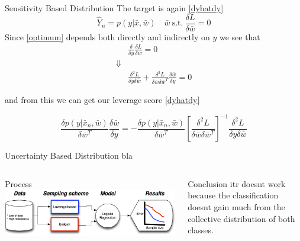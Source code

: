 \documentclass{beamer}
\newenvironment{pblock}{\begin{minipage}[b]{\linewidth}
	\begin{block}}{\end{block} 	\end{minipage}\vspace*{15pt}}
\begin{document}
{\begin{columns}[t]
\begin{column}{.3\linewidth}
    
    	\begin{pblock}{Sensitivity Based Distribution}
    	The target is again \eqref{dyhatdy} 
    	\begin{equation*}
    	\label{optimum}
    	 \hat{Y}_n = p(y|\bar{x},\bar{w}) \quad \bar{w} \  \text{s.t.} \ \frac{\delta L}{\delta\bar{w}}=0
    	\end{equation*}
    	Since \ref{optimum} depends both directly and indirectly on $y$ we see that
    	\begin{eqnarray*}
    	&\frac{\delta}{\delta y} \frac{\delta L}{\delta w} = 0\\
    	\Downarrow & \\
    	&\frac{\delta^2 L}{\delta y \delta \bar{w}} + \frac{\delta^2 L}{\delta \bar{w} \delta \bar{w}^T} \frac{\delta \bar{w}}{\delta y}= 0
    	\end{eqnarray*}
    	
    	and from this we can get our leverage score \eqref{dyhatdy}
    	
    	\begin{equation*}
    	\frac{\delta p(y|\bar{x}_n,\bar{w})}{\delta \bar{w}^T} \frac{\delta \bar{w}}{\delta y} = - \frac{\delta p(y|\bar{x}_n,\bar{w})}{\delta \bar{w}^T} \left[ \frac{\delta^2 L}{\delta \bar{w} \delta \bar{w}^T} \right]^{-1} \frac{\delta^2 L}{\delta y \delta \bar{w}}
    	\end{equation*}
    	\end{pblock}
    	
    
    \begin{pblock}{Uncertainty Based Distribution}
    	bla
    	\end{pblock}
    
    
    \end{column}
  \end{columns}
\begin{columns}
	\begin{column}{.61\linewidth}
		\begin{block}{Process}
			\includegraphics[width=\linewidth]{ThoughModel.png}
		  
		\end{block}
	\end{column}
	\begin{column}{.3\linewidth}
			\begin{block}{Conclusion}
				itr doesnt work because the classification doesnt gain much from the collective distribution of both classes.
			\end{block}
	\end{column}
\end{columns}	
	
  }
\end{document}
